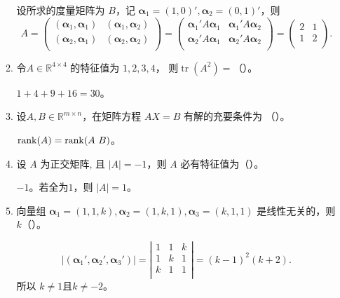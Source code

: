 \begin{enumerate}[1~]
\begin{enumerate}[1.~]
\begin{solution}
设所求的度量矩阵为 $B$，记 $\boldsymbol{\alpha}_1=(1, 0)', \boldsymbol{\alpha}_2=(0, 1)'$，则\[
A=
\left( \begin{matrix}
	\left( \boldsymbol{\alpha} _1,\boldsymbol{\alpha} _1 \right)&		\left( \boldsymbol{\alpha} _1,\boldsymbol{\alpha} _2 \right)\\
	\left( \boldsymbol{\alpha} _2,\boldsymbol{\alpha} _1 \right)&		\left( \boldsymbol{\alpha} _2,\boldsymbol{\alpha} _2 \right)\\
\end{matrix} \right) =\left( \begin{matrix}
	\boldsymbol{\alpha} _1'A\boldsymbol{\alpha} _1&		\boldsymbol{\alpha} _1'A\boldsymbol{\alpha} _2\\
	\boldsymbol{\alpha} _2'A\boldsymbol{\alpha} _1&		\boldsymbol{\alpha} _2'A\boldsymbol{\alpha} _2\\
\end{matrix} \right) =\left( \begin{matrix}
	2&		1\\
	1&		2\\
\end{matrix} \right) .
\]
\end{solution}
\item
令$A \in \mathbb { R } ^ { 4 \times 4 }$ 的特征值为 $1, 2, 3, 4$， 则$\operatorname { tr } \left( A ^ { 2 } \right) =$（\quad）。 
\begin{solution}
$1+4+9+16=30$。
\end{solution}
\item
设$A , B \in \mathbb { R } ^ { m \times n }$，在矩阵方程 $AX = B$ 有解的充要条件为 （\quad）。
 \begin{solution}
${\rm rank}(A)={\rm rank}(A\ B)$。
\end{solution}
\item
设 $A$ 为正交矩阵, 且 $|A| = -1$，则 $A$ 必有特征值为（\quad）。 
\begin{solution}
$-1$。若全为$1$，则 $|A|=1$。
\end{solution}
\item
 向量组 $\boldsymbol{\alpha} _ { 1 } = ( 1,1 , k ) , \boldsymbol{\alpha} _ { 2 } = ( 1 , k , 1 ) , \boldsymbol{\alpha} _ { 3 } = ( k , 1,1 )$ 是线性无关的，则 $k$（\quad）。 
 \begin{solution}
\[|(\boldsymbol{\alpha}_1', \boldsymbol{\alpha}_2', \boldsymbol{\alpha}_3')|=\left|
\begin{array}{ccc}
 1 & 1 & k \\
 1 & k & 1 \\
 k & 1 & 1 \\
\end{array}
\right|=(k-1)^2(k+2).\]
所以 $k\ne1$且$k\ne -2$。
\end{solution}
\end{enumerate}


\end{enumerate}
